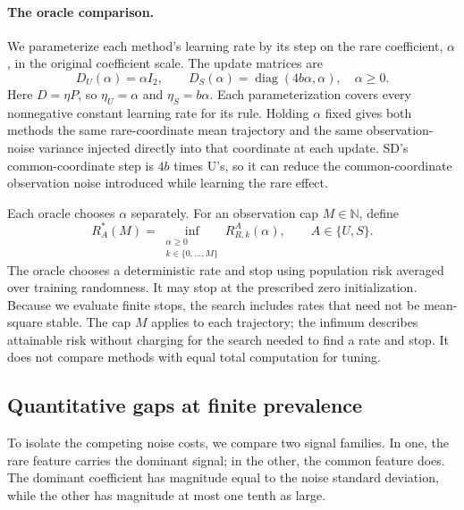 \documentclass{alt2027}
\DeclareMathOperator{\diag}{diag}
\begin{document}
\paragraph{The oracle comparison.}

We parameterize each method's learning rate by its step on the rare coefficient,
$\alpha$, in the original coefficient scale. The update matrices are
\begin{equation}
  D_U(\alpha) =    \alpha I_2,\qquad D_S(\alpha)
              =    \diag(4b\alpha,\alpha),\quad \alpha
              \geq 0. \label{eq:conference-oracle-rates}
\end{equation}
Here $D = \eta P$, so $\eta_U = \alpha$ and $\eta_S = b\alpha$. Each
parameterization covers every nonnegative constant learning rate for its rule.
Holding $\alpha$ fixed gives both methods the same rare-coordinate mean
trajectory and the same observation-noise variance injected directly into that
coordinate at each update. SD's common-coordinate step is $4b$ times U's, so it
can reduce the common-coordinate observation noise introduced while learning the
rare effect.

Each oracle chooses $\alpha$ separately. For an observation cap
$M \in \mathbb N$, define
\begin{equation}
  R_A^*(M)
  =   \inf_{\substack{\alpha\geq0\\ k\in\{0,\ldots,M\}}} R_{R,k}^{A}(\alpha),\qquad A
  \in \{U,S\}.
\end{equation}
The oracle chooses a deterministic rate and stop using population risk averaged
over training randomness. It may stop at the prescribed zero initialization.
Because we evaluate finite stops, the search includes rates that need not be
mean-square stable. The cap $M$ applies to each trajectory; the infimum
describes attainable risk without charging for the search needed to find a rate
and stop. It does not compare methods with equal total computation for tuning.

\subsection{Quantitative gaps at finite prevalence}

To isolate the competing noise costs, we compare two signal families. In one,
the rare feature carries the dominant signal; in the other, the common feature
does. The dominant coefficient has magnitude equal to the noise standard
deviation, while the other has magnitude at most one tenth as large.
\end{document}

